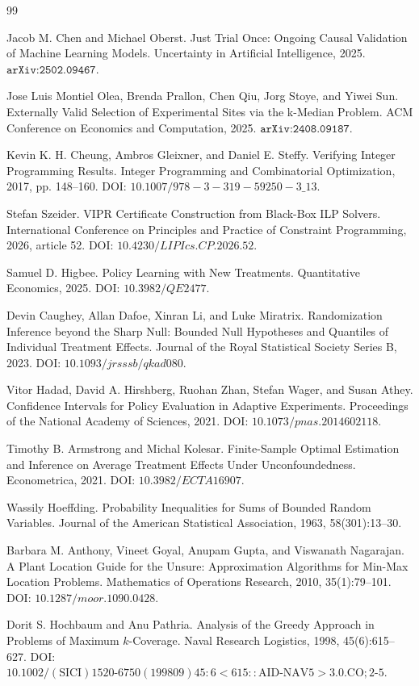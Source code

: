 \documentclass{article}
\begin{document}
\begin{thebibliography}{99}

   Jacob M. Chen and Michael Oberst. Just Trial Once: Ongoing Causal Validation of Machine Learning Models. Uncertainty in Artificial Intelligence, 2025. \(\texttt{arXiv:2502.09467}\).

   Jose Luis Montiel Olea, Brenda Prallon, Chen Qiu, Jorg Stoye, and Yiwei Sun. Externally Valid Selection of Experimental Sites via the k-Median Problem. ACM Conference on Economics and Computation, 2025. \(\texttt{arXiv:2408.09187}\).

   Kevin K. H. Cheung, Ambros Gleixner, and Daniel E. Steffy. Verifying Integer Programming Results. Integer Programming and Combinatorial Optimization, 2017, pp. 148--160. DOI: \(10.1007/978-3-319-59250-3\_13\).

   Stefan Szeider. VIPR Certificate Construction from Black-Box ILP Solvers. International Conference on Principles and Practice of Constraint Programming, 2026, article 52. DOI: \(10.4230/LIPIcs.CP.2026.52\).

   Samuel D. Higbee. Policy Learning with New Treatments. Quantitative Economics, 2025. DOI: \(10.3982/QE2477\).

   Devin Caughey, Allan Dafoe, Xinran Li, and Luke Miratrix. Randomization Inference beyond the Sharp Null: Bounded Null Hypotheses and Quantiles of Individual Treatment Effects. Journal of the Royal Statistical Society Series B, 2023. DOI: \(10.1093/jrsssb/qkad080\).

   Vitor Hadad, David A. Hirshberg, Ruohan Zhan, Stefan Wager, and Susan Athey. Confidence Intervals for Policy Evaluation in Adaptive Experiments. Proceedings of the National Academy of Sciences, 2021. DOI: \(10.1073/pnas.2014602118\).

   Timothy B. Armstrong and Michal Kolesar. Finite-Sample Optimal Estimation and Inference on Average Treatment Effects Under Unconfoundedness. Econometrica, 2021. DOI: \(10.3982/ECTA16907\).

   Wassily Hoeffding. Probability Inequalities for Sums of Bounded Random Variables. Journal of the American Statistical Association, 1963, 58(301):13--30.

   Barbara M. Anthony, Vineet Goyal, Anupam Gupta, and Viswanath Nagarajan. A Plant Location Guide for the Unsure: Approximation Algorithms for Min-Max Location Problems. Mathematics of Operations Research, 2010, 35(1):79--101. DOI: \(10.1287/moor.1090.0428\).

   Dorit S. Hochbaum and Anu Pathria. Analysis of the Greedy Approach in Problems of Maximum \(k\)-Coverage. Naval Research Logistics, 1998, 45(6):615--627. DOI: \(10.1002/(\mathrm{SICI})1520\text{-}6750(199809)45{:}6<615{::}\mathrm{AID}\text{-}\mathrm{NAV}5>3.0.\mathrm{CO};2\text{-}5\).

\end{thebibliography}
\end{document}
